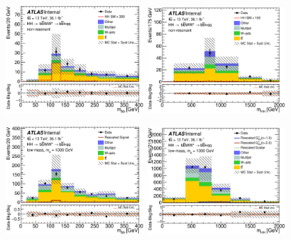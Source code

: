 \begin{figure}[!h]
\begin{center}
\includegraphics*[width=0.47\textwidth] {figures/ControlPlots_new/reOptNonRes/C_reOptNonRes_mww_bbpt210_bbpt300_bbMass_regionA_met25d020}
\includegraphics*[width=0.47\textwidth] {figures/ControlPlots_new/reOptNonRes/C_mBBcr_reOptNonRes_mww_bbpt210_bbpt300_hhMass_regionA_met25d020}

\includegraphics*[width=0.47\textwidth] {figures/ControlPlots_new/reOpt700/C_reOpt700_mww_bbpt210_bbMass_regionA_met25d020}
\includegraphics*[width=0.47\textwidth] {figures/ControlPlots_new/reOpt700/C_mBBcr_reOpt700_mww_bbpt210_hhMass_regionA_met25d020}


\end{center}
\end{figure}
